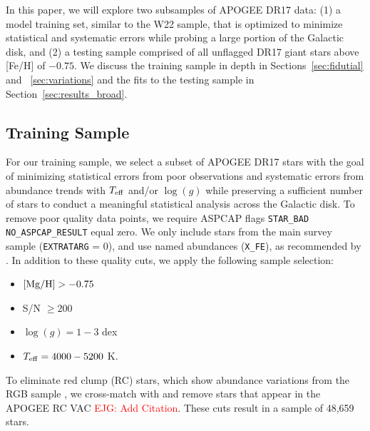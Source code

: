 \documentclass[modern]{aastex631}
\newcommand{\mgh}{[{\rm Mg}/{\rm H}]}
\newcommand{\logg}{\log(g)}
\newcommand{\teff}{T_{\rm eff}}
\newcommand{\ejg}[1]{\textcolor{red}{EJG: #1}}
\begin{document}
In this paper, we will explore two subsamples of APOGEE DR17 data: (1) a model training set, similar to the W22 sample, that is optimized to minimize statistical and systematic errors while probing a large portion of the Galactic disk, and (2) a testing sample comprised of all unflagged DR17 giant stars above [Fe/H] of $-0.75$. We discuss the training sample in depth in Sections~\ref{sec:fidutial} and ~\ref{sec:variations} and the fits to the testing sample in Section~\ref{sec:results_broad}.

\subsection{Training Sample}\label{subsec:train}

For our training sample, we select a subset of APOGEE DR17 stars with the goal of minimizing statistical errors from poor observations and systematic errors from abundance trends with $\teff$ and/or $\logg$ while preserving a sufficient number of stars to conduct a meaningful statistical analysis across the Galactic disk. To remove poor quality data points, we require ASPCAP flags \texttt{STAR\_BAD} \texttt{NO\_ASPCAP\_RESULT} equal zero. We only include stars from the main survey sample (\texttt{EXTRATARG} = 0), and use named abundances (\texttt{X\_FE}), as recommended by \citet{jonsson2020}. In addition to these quality cuts, we apply the following sample selection:
\begin{itemize}
\itemsep0em
    \item $\mgh > -0.75$
    \item S/N $\geq 200$
    \item $\logg = 1-3$ dex
    \item $\teff = 4000-5200$ K.
\end{itemize}
To eliminate red clump (RC) stars, which show abundance variations from the RGB sample \citep{vincenzo2021a}, we cross-match with and remove stars that appear in the APOGEE RC VAC \ejg{Add Citation}. These cuts result in a sample of 48,659 stars. 

\end{document}

